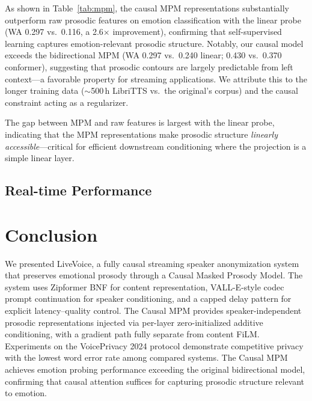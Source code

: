 \documentclass{article}
\begin{document}
As shown in Table~\ref{tab:mpm}, the causal MPM representations substantially outperform raw prosodic features on emotion classification with the linear probe (WA 0.297 vs.\ 0.116, a 2.6$\times$ improvement), confirming that self-supervised learning captures emotion-relevant prosodic structure.
Notably, our causal model exceeds the bidirectional MPM (WA 0.297 vs.\ 0.240 linear; 0.430 vs.\ 0.370 conformer), suggesting that prosodic contours are largely predictable from left context---a favorable property for streaming applications.
We attribute this to the longer training data ($\sim$500\,h LibriTTS vs.\ the original's corpus) and the causal constraint acting as a regularizer.

The gap between MPM and raw features is largest with the linear probe, indicating that the MPM representations make prosodic structure \textit{linearly accessible}---critical for efficient downstream conditioning where the projection is a simple linear layer.

\subsection{Real-time Performance}
\label{ssec:rtf and latency}

\section{Conclusion}
\label{sec:conclusion}

We presented LiveVoice, a fully causal streaming speaker anonymization system that preserves emotional prosody through a Causal Masked Prosody Model.
The system uses Zipformer BNF for content representation, VALL-E-style codec prompt continuation for speaker conditioning, and a capped delay pattern for explicit latency--quality control.
The Causal MPM provides speaker-independent prosodic representations injected via per-layer zero-initialized additive conditioning, with a gradient path fully separate from content FiLM.
Experiments on the VoicePrivacy 2024 protocol demonstrate competitive privacy with the lowest word error rate among compared systems.
The Causal MPM achieves emotion probing performance exceeding the original bidirectional model, confirming that causal attention suffices for capturing prosodic structure relevant to emotion.











\end{document}
